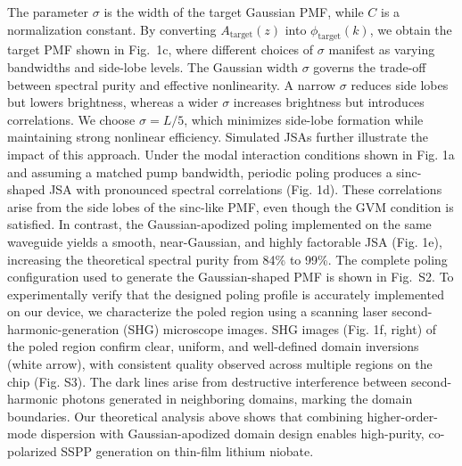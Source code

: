 \documentclass[aps, amsmath, amssymb,reprint,superscriptaddress]{revtex4-2}
\begin{document}
The parameter $\sigma$ is the width of the target Gaussian PMF, while $C$ is a normalization constant. By converting $A_{\mathrm{target}}(z)$ into $\phi_{\mathrm{target}}(k)$, we obtain the target PMF shown in Fig.~1c, where different choices of $\sigma$ manifest as varying bandwidths and side-lobe levels. The Gaussian width $\sigma$ governs the trade-off between spectral purity and effective nonlinearity. A narrow $\sigma$ reduces side lobes but lowers brightness, whereas a wider $\sigma$ increases brightness but introduces correlations. We choose $\sigma=L/5$, which minimizes side-lobe formation while maintaining strong nonlinear efficiency. Simulated JSAs further illustrate the impact of this approach. Under the modal interaction conditions shown in Fig. 1a and assuming a matched pump bandwidth, periodic poling produces a sinc-shaped JSA with pronounced spectral correlations (Fig. 1d). These correlations arise from the side lobes of the sinc-like PMF, even though the GVM condition is satisfied. In contrast, the Gaussian-apodized poling implemented on the same waveguide yields a smooth, near-Gaussian, and highly factorable JSA (Fig. 1e), increasing the theoretical spectral purity from 84\% to 99\%. The complete poling configuration used to generate the Gaussian-shaped PMF is shown in Fig.~S2. To experimentally verify that the designed poling profile is accurately implemented on our device, we characterize the poled region using a scanning laser second-harmonic-generation (SHG) microscope images. SHG images (Fig. 1f, right) of the poled region confirm clear, uniform, and well-defined domain inversions (white arrow), with consistent quality observed across multiple regions on the chip (Fig. S3). The dark lines arise from destructive interference between second-harmonic photons generated in neighboring domains, marking the domain boundaries. Our theoretical analysis above shows that combining higher-order-mode dispersion with Gaussian-apodized domain design enables high-purity, co-polarized SSPP generation on thin-film lithium niobate.
\end{document}
